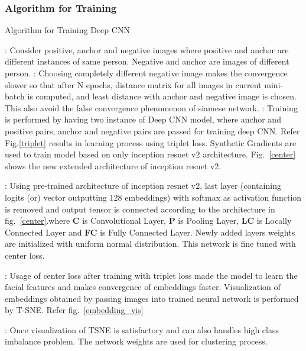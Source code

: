 \documentclass[a4paper,12pt, twoside]{NITKReport}
\begin{document}
\subsubsection{Algorithm for Training}
\begin{algorithm}
\caption{Algorithm for Training Deep CNN}
\begin{algorithmic} 
: Consider positive, anchor and negative images where positive and anchor are different instances of same person. Negative and anchor are images of different person.
: Choosing completely different negative image makes the convergence slower so that after N epochs, distance matrix for all images in current mini-batch is computed, and least distance with anchor and negative image is chosen. This also avoid the false convergence phenomenon of siamese network. 
: Training is performed by having two instance of Deep CNN model, where anchor and positive pairs, anchor and negative pairs are passed for training deep CNN. Refer Fig.\ref{triplet} results in learning process using triplet loss. Synthetic Gradients are used to train model based on only inception resnet v2 architecture. Fig.~\ref{center} shows the new extended architecture of inception resnet v2.

: Using pre-trained architecture of inception resnet v2, last layer (containing logits (or) vector outputting 128 embeddings) with softmax as activation function is removed and output tensor is connected according to the architecture in fig.~\ref{center}.where \textbf{C} is Convolutional Layer, \textbf{P} is Pooling Layer, \textbf{LC} is Locally Connected Layer and \textbf{FC} is Fully Connected Layer. Newly added layers weights are initialized with uniform normal distribution. This network is fine tuned with center loss. 

: Usage of center loss after training with triplet loss made the model to learn the facial features and makes convergence of embeddings faster. Visualization of embeddings obtained by passing images into trained neural network is performed by T-SNE. Refer fig.~\ref{embedding_vis}

: Once visualization of TSNE is satisfactory and can also handles high class imbalance problem. The network weights are used for clustering process.

\end{algorithmic}
\end{algorithm}
\end{document}
